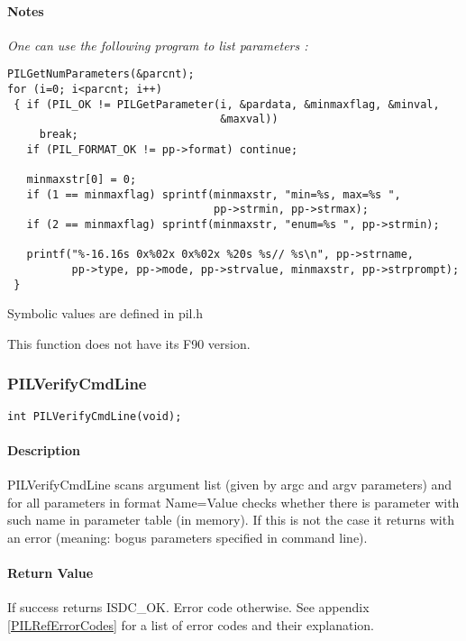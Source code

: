\paragraph{Notes\\}
{\it
One can use the following program to list parameters :

\begin{verbatim}
PILGetNumParameters(&parcnt);
for (i=0; i<parcnt; i++)
 { if (PIL_OK != PILGetParameter(i, &pardata, &minmaxflag, &minval, 
                                 &maxval))
     break;
   if (PIL_FORMAT_OK != pp->format) continue;

   minmaxstr[0] = 0;
   if (1 == minmaxflag) sprintf(minmaxstr, "min=%s, max=%s ", 
                                pp->strmin, pp->strmax);
   if (2 == minmaxflag) sprintf(minmaxstr, "enum=%s ", pp->strmin);

   printf("%-16.16s 0x%02x 0x%02x %20s %s// %s\n", pp->strname, 
          pp->type, pp->mode, pp->strvalue, minmaxstr, pp->strprompt);
 }
\end{verbatim}

Symbolic values are defined in pil.h

This function does not have its F90 version.
}



\subsubsection{PILVerifyCmdLine}

\begin{verbatim}
int PILVerifyCmdLine(void); 
\end{verbatim}

\paragraph{Description\\}
PILVerifyCmdLine scans argument list (given by argc and argv parameters) and
for all parameters in format Name=Value checks whether there is parameter with
such name in parameter table (in memory). If this is not the case it returns
with an error (meaning: bogus parameters specified in command line).

\paragraph{Return Value\\}
If success returns ISDC\_OK. Error code otherwise. See appendix \ref{PILRefErrorCodes}
for a list of error codes and their explanation.

